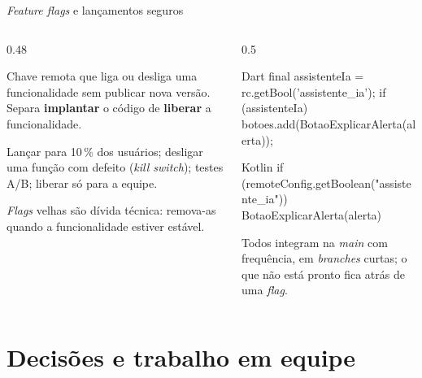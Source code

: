 \documentclass[aspectratio=169,10pt]{beamer}
\begin{document}
\begin{frame}[fragile]{\emph{Feature flags} e lançamentos seguros}
  \begin{columns}[T]
    \begin{column}{0.48\textwidth}
      \begin{definicao}
        Chave remota que liga ou desliga uma funcionalidade sem publicar nova versão. Separa \textbf{implantar} o código de \textbf{liberar} a funcionalidade.
      \end{definicao}
      \begin{conceito}[Usos]
        Lançar para 10\,\% dos usuários; desligar uma função com defeito (\emph{kill switch}); testes A/B; liberar só para a equipe.
      \end{conceito}
      \begin{atencao}
        \emph{Flags} velhas são dívida técnica: remova-as quando a funcionalidade estiver estável.
      \end{atencao}
    \end{column}
    \begin{column}{0.5\textwidth}
\begin{codigo}[title=Dart + Remote Config (Módulo 12)]{Dart}
final assistenteIa = rc.getBool('assistente_ia');
if (assistenteIa) {
  botoes.add(BotaoExplicarAlerta(alerta));
}
\end{codigo}
\begin{codigo}[title=Kotlin]{Kotlin}
if (remoteConfig.getBoolean("assistente_ia")) {
  BotaoExplicarAlerta(alerta)
}
\end{codigo}
      \begin{definicao}
        Todos integram na \emph{main} com frequência, em \emph{branches} curtas; o que não está pronto fica atrás de uma \emph{flag}.
      \end{definicao}
    \end{column}
  \end{columns}
\end{frame}

\section{Decisões e trabalho em equipe}
\end{document}
